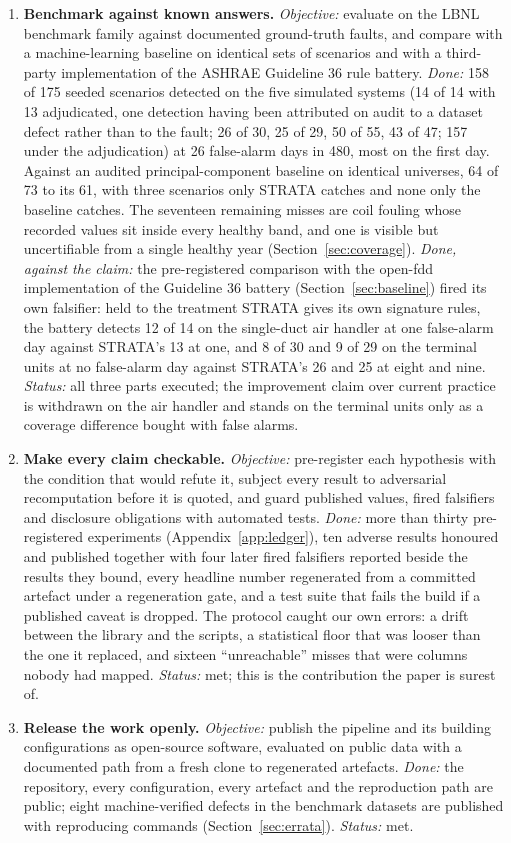 \documentclass[11pt,letterpaper]{article}
\begin{document}
\begin{enumerate}
\item \textbf{Benchmark against known answers.} \emph{Objective:} evaluate on the LBNL benchmark family against documented ground-truth faults, and compare with a machine-learning baseline on identical sets of scenarios and with a third-party implementation of the ASHRAE Guideline 36 rule battery. \emph{Done:} 158 of 175 seeded scenarios detected on the five simulated systems (14 of 14 with 13 adjudicated, one detection having been attributed on audit to a dataset defect rather than to the fault; 26 of 30, 25 of 29, 50 of 55, 43 of 47; 157 under the adjudication) at 26 false-alarm days in 480, most on the first day. Against an audited principal-component baseline on identical universes, 64 of 73 to its 61, with three scenarios only STRATA catches and none only the baseline catches. The seventeen remaining misses are coil fouling whose recorded values sit inside every healthy band, and one is visible but uncertifiable from a single healthy year (Section~\ref{sec:coverage}). \emph{Done, against the claim:} the pre-registered comparison with the open-fdd implementation of the Guideline 36 battery (Section~\ref{sec:baseline}) fired its own falsifier: held to the treatment STRATA gives its own signature rules, the battery detects 12 of 14 on the single-duct air handler at one false-alarm day against STRATA's 13 at one, and 8 of 30 and 9 of 29 on the terminal units at no false-alarm day against STRATA's 26 and 25 at eight and nine. \emph{Status:} all three parts executed; the improvement claim over current practice is withdrawn on the air handler and stands on the terminal units only as a coverage difference bought with false alarms.

\item \textbf{Make every claim checkable.} \emph{Objective:} pre-register each hypothesis with the condition that would refute it, subject every result to adversarial recomputation before it is quoted, and guard published values, fired falsifiers and disclosure obligations with automated tests. \emph{Done:} more than thirty pre-registered experiments (Appendix~\ref{app:ledger}), ten adverse results honoured and published together with four later fired falsifiers reported beside the results they bound, every headline number regenerated from a committed artefact under a regeneration gate, and a test suite that fails the build if a published caveat is dropped. The protocol caught our own errors: a drift between the library and the scripts, a statistical floor that was looser than the one it replaced, and sixteen ``unreachable'' misses that were columns nobody had mapped. \emph{Status:} met; this is the contribution the paper is surest of.

\item \textbf{Release the work openly.} \emph{Objective:} publish the pipeline and its building configurations as open-source software, evaluated on public data with a documented path from a fresh clone to regenerated artefacts. \emph{Done:} the repository, every configuration, every artefact and the reproduction path are public; eight machine-verified defects in the benchmark datasets are published with reproducing commands (Section~\ref{sec:errata}). \emph{Status:} met.
\end{enumerate}
\end{document}
